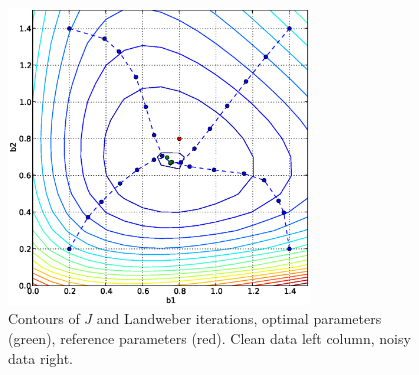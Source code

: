 \begin{figure}
\begin{center}
    \includegraphics[width=8cm]{chapters/schroll/eps/b1b2scan4-5.eps}
    \end{center}
  \caption{Contours of $J$ and Landweber iterations, optimal parameters (green), reference parameters (red).
   Clean data left column, noisy data right. \label{fig2}}
\end{figure}

